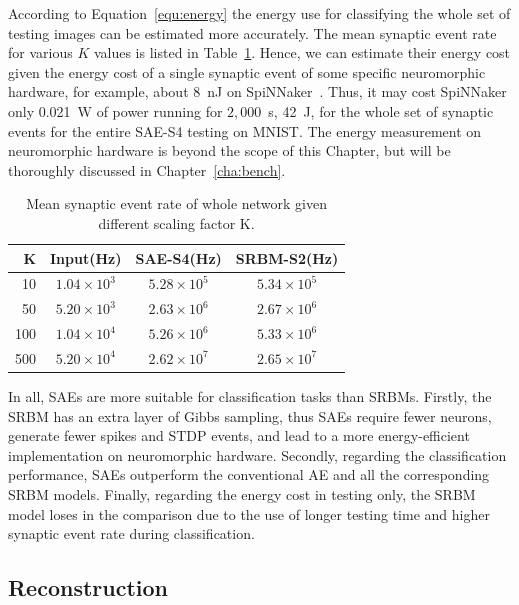 According to Equation~\ref{equ:energy} the energy use for classifying the whole set of testing images can be estimated more accurately.
The mean synaptic event rate for various $K$ values is listed in Table~\ref{tbl:fire_rate}.
Hence, we can estimate their energy cost given the energy cost of a single synaptic event of some specific neuromorphic hardware, for example, about 8~nJ on SpiNNaker~\citep{stromatias2013power}.
Thus, it may cost SpiNNaker only 0.021~W of power running for $2,000$~s, 42~J, for the whole set of synaptic events for the entire SAE-S4 testing on MNIST.
The energy measurement on neuromorphic hardware is beyond the scope of this Chapter, but will be thoroughly discussed in Chapter~\ref{cha:bench}.
\begin{table}[htbp]
	\centering
	\caption{\label{tbl:fire_rate}Mean synaptic event rate of whole network given different scaling factor K.}
	\bgroup
	\def\arraystretch{1.4}
	\begin{tabular}{r c c c}
		K & Input(Hz) & SAE-S4(Hz) & SRBM-S2(Hz)\\
		\hline
		10 & $1.04 \times 10^3$ & $5.28 \times 10^5$ & $5.34 \times 10^5$ \\
		50 & $5.20 \times 10^3$ & $2.63 \times 10^6$ & $2.67 \times 10^6$ \\
		100 & $1.04 \times 10^4$ & $5.26 \times 10^6$ & $5.33 \times 10^6$ \\
		500 & $5.20 \times 10^4$ & $2.62 \times 10^7$ & $2.65 \times 10^7$ \\
	\end{tabular}
	\egroup
\end{table}

In all, SAEs are more suitable for classification tasks than SRBMs.
Firstly, the SRBM has an extra layer of Gibbs sampling, thus SAEs require  fewer neurons, generate fewer spikes and STDP events, and lead to a more energy-efficient implementation on neuromorphic hardware.
Secondly, regarding the classification performance, SAEs outperform the conventional AE and all the corresponding SRBM models.
Finally, regarding the energy cost in testing only, the SRBM model loses in the comparison due to the use of longer testing time and higher synaptic event rate during classification.

\subsection{Reconstruction}

